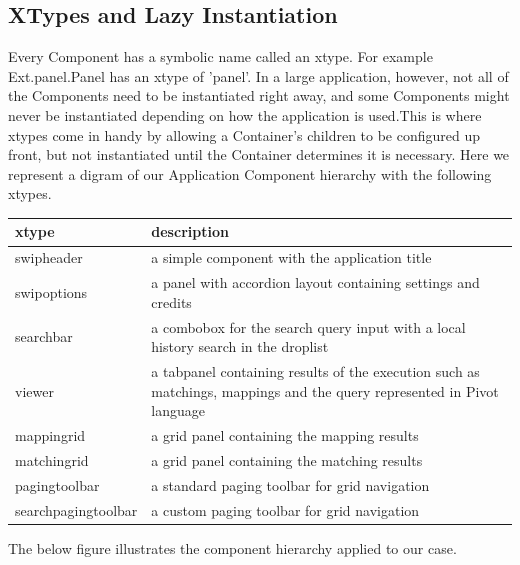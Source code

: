 \subsection{XTypes and Lazy Instantiation}
\par Every Component has a symbolic name called an xtype. For example Ext.panel.Panel has an xtype of 'panel'. In a large application, however, not all of the Components need to be instantiated right away, and some Components might never be instantiated depending on how the application is used.This is where xtypes come in handy by allowing a Container's children to be configured up front, but not instantiated until the Container determines it is necessary.
Here we represent a digram of our Application Component hierarchy with the following xtypes.\\
\begin{center}
       \begin{tabular}{ | l | p{10cm} |}
                \hline
		xtype & description \\ \hline
		swipheader & a simple component with the application title \\ \hline
		swipoptions & a panel with accordion layout containing settings and credits \\ \hline
		searchbar & a combobox for the search query input with a local history search in the droplist \\ \hline
		viewer & a tabpanel containing results of the execution such as matchings, mappings and the query represented in Pivot language \\ \hline
		mappingrid & a grid panel containing the mapping results \\ \hline
		matchingrid & a grid panel containing the matching results \\ \hline
		pagingtoolbar & a standard paging toolbar for grid navigation \\ \hline
		searchpagingtoolbar & a custom paging toolbar for grid navigation \\
		\hline
	\end{tabular}
	\label{tab:}
\end{center}
	The below figure illustrates the component hierarchy applied to our case.
